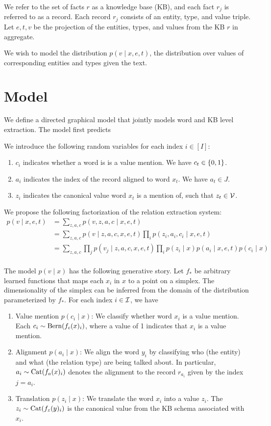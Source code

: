 \documentclass[12pt]{article}
\begin{document}
We refer to the set of facts $r$ as a knowledge base (KB),
and each fact $r_j$ is referred to as a record.
Each record $r_j$ consists of an entity, type, and value triple. 
Let $e,t,v$ be the projection of the entities, types, and values
from the KB $r$ in aggregate.

We wish to model the distribution $p(v \mid x, e, t)$,
the distribution over values of corresponding entities and types given the text.

\section{Model}
We define a directed graphical model that jointly models 
word and KB level extraction. 
The model first predicts

We introduce the following random variables for each index $i \in [I]$:
\begin{enumerate}
\item $c_i$ indicates whether a word is is a value mention.
    We have $c_t \in \left\{0,1\right\}$.
\item $a_i$ indicates the index of the record aligned to word $x_t$.
    We have $a_t \in J$.
\item $z_i$ indicates the canonical value word $x_t$ is a mention of,
    such that $z_t \in \mathcal{V}$.
\end{enumerate}

We propose the following factorization of the relation extraction system:
\begin{equation}
\begin{aligned}
p(v \mid x,e,t) &= \sum_{z,a,c} p(v,z,a,c\mid x,e,t)\\
&= \sum_{z,a,c} p(v\mid z,a,c,x,e,t) \prod_i p(z_i, a_i, c_i\mid x,e,t)\\
&= \sum_{z,a,c} \prod_j p(v_j\mid z,a,c,x,e,t) \prod_i p(z_i\mid x)p(a_i\mid x,e,t)p(c_i\mid x)\\
\end{aligned}
\end{equation}

The model $p(v\mid x)$ has the following generative story.
Let $f_*$ be arbitrary learned functions that maps each $x_i$ in $x$ to
a point on a simplex.
The dimensionality of the simplex can be inferred from the domain of the
distribution parameterized by $f_*$.
For each index $i \in \mathcal{I}$, we have
\begin{enumerate}
\item Value mention $p(c_i \mid x)$: We classify whether word $x_i$
   is a value mention. Each $c_i \sim \mathrm{Bern}(f_c(x)_i)$, where a value of 1 indicates
   that $x_i$ is a value mention.
\item Alignment $p(a_i \mid x)$: We align the word $y_i$ by classifying who (the entity)
    and what (the relation type) are being talked about.
    In particular, $a_i\sim\mathrm{Cat}(f_a(x)_i)$ denotes the alignment to the record $r_{a_i}$
    given by the index $j = a_i$. 
\item Translation $p(z_i \mid x)$: We translate the word $x_i$ into a value $z_i$.
    The $z_i \sim \mathrm{Cat}(f_z(y)_i)$ is the canonical value from the KB schema 
    associated with $x_i$.
\end{enumerate}
\end{document}
